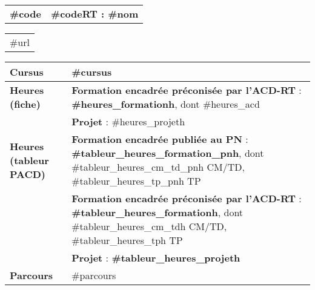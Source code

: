 
 \label{subsubsec:#codelatex}


\setlength{\tabcolsep}{0.125cm} %
\setlength{\extrarowheight}{2pt} %


\begin{tabular}[t]{|P|T|}
\hline %
	 \textcolor{compCAp!20!white}{\bfseries \hypertarget{#codelatex}{#code}}
    &  \textcolor{compCAp!20!white}{\bfseries #codeRT : #nom}
\\
\end{tabular}


\begin{tabular}[t]{|G|}
\hline %
	#url
\\
\end{tabular}

\begin{tabular}[t]{|P|T|}
\hline %
	\textcolor{saeC}{\bfseries Cursus}
	& #cursus  \\
\hline %
\hline
    \textcolor{saeC}{\bfseries Heures (fiche)}
    &
    \textcolor{saeC}{\bfseries Formation encadrée préconisée par l'ACD-RT} : {\bfseries {#heures_formation}h}, dont {#heures_acd} \\
	& \textcolor{saeC}{\bfseries Projet} : {#heures_projet}h \\
\hline
\hline
    \textcolor{saeC}{\bfseries Heures (tableur PACD)}
    &
    \textcolor{saeC}{\bfseries Formation encadrée publiée au PN} : {\bfseries {#tableur_heures_formation_pn}h}, dont {#tableur_heures_cm_td_pn}h CM/TD, {#tableur_heures_tp_pn}h TP \\ %
    &
    \textcolor{saeC}{\bfseries Formation encadrée préconisée par l'ACD-RT} : {\bfseries {#tableur_heures_formation}h}, dont {#tableur_heures_cm_td}h CM/TD, {#tableur_heures_tp}h TP \\
    &
    \textcolor{saeC}{\bfseries Projet} : {\bfseries {#tableur_heures_projet}h} \\
\hline

\hline %
	\textcolor{saeC}{\bfseries Parcours}
	& #parcours \\
\hline
\end{tabular}

